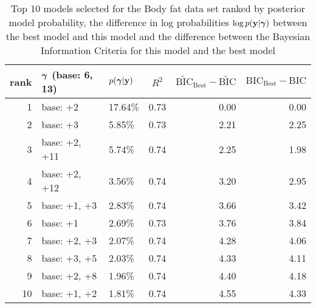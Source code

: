 \documentclass{amsart}
\begin{document}
\begin{table}
\label{tab:numerical_results_bodyfat}
\caption{Top 10 models selected for the Body fat data set ranked by posterior model probability, the difference
					in log probabilities $\log p({\bf y}|{\boldsymbol \gamma})$ between the best model and this model and the difference
					between the Bayesian Information Criteria for this model and the best model}
\begin{center}
\begin{tabular}{r|l|l|c|r|r}
rank & ${\boldsymbol \gamma}$ (base: 6, 13) & $p({\boldsymbol \gamma}|{\bf y})$ & $R^2$ & $\widetilde{\text{BIC}}_\text{Best} - \widetilde{\text{BIC}}$ & $\text{BIC}_\text{Best} - \text{BIC}$ \\
\hline
1  & base: +2&  17.64\%&  0.73&  0.00&  0.00\\
2 & base: +3&  5.85\%&  0.73&  2.21&  2.25\\
3 & base: +2, +11&  5.74\%&  0.74&  2.25&  1.98\\
4 & base: +2, +12&  3.56\%&  0.74&  3.20&  2.95\\
5 & base: +1, +3&  2.83\%&  0.74&  3.66&  3.42\\
6 & base: +1&  2.69\%&  0.73&  3.76&  3.84\\
7 & base: +2, +3&  2.07\%&  0.74&  4.28&  4.06\\
8 & base: +3, +5&  2.03\%&  0.74&  4.33&  4.11\\
9 & base: +2, +8&  1.96\%&  0.74&  4.40&  4.18\\
10 & base: +1, +2&  1.81\%&  0.74&  4.55&  4.33\\
\end{tabular}
\end{center}
\end{table}
\end{document}
